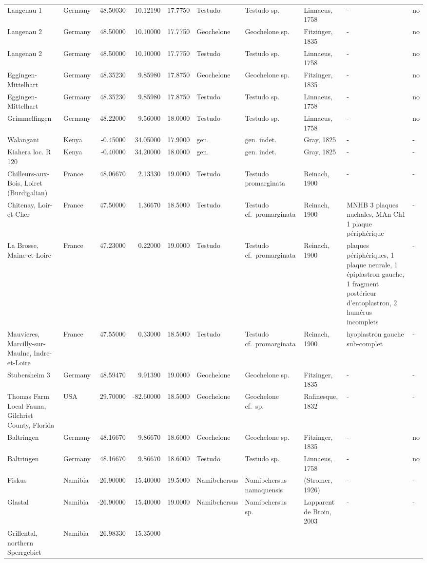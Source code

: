\begin{landscape}
{\begin{longtable}[]{@{}llrrrlllll@{}}
Langenau 1 & Germany & 48.50030 & 10.12190 & 17.7750 & Testudo & Testudo
sp. & Linnaeus, 1758 & - & no\tabularnewline
Langenau 2 & Germany & 48.50000 & 10.10000 & 17.7750 & Geochelone &
Geochelone sp. & Fitzinger, 1835 & - & no\tabularnewline
Langenau 2 & Germany & 48.50000 & 10.10000 & 17.7750 & Testudo & Testudo
sp. & Linnaeus, 1758 & - & no\tabularnewline
Eggingen-Mittelhart & Germany & 48.35230 & 9.85980 & 17.8750 &
Geochelone & Geochelone sp. & Fitzinger, 1835 & - & no\tabularnewline
Eggingen-Mittelhart & Germany & 48.35230 & 9.85980 & 17.8750 & Testudo &
Testudo sp. & Linnaeus, 1758 & - & no\tabularnewline
Grimmelfingen & Germany & 48.22000 & 9.56000 & 18.0000 & Testudo &
Testudo sp. & Linnaeus, 1758 & - & no\tabularnewline
Walangani & Kenya & -0.45000 & 34.05000 & 17.9000 & gen. & gen. indet. &
Gray, 1825 & - & -\tabularnewline
Kiahera loc. R 120 & Kenya & -0.40000 & 34.20000 & 18.0000 & gen. & gen.
indet. & Gray, 1825 & - & -\tabularnewline
Chilleurs-aux-Bois, Loiret (Burdigalian) & France & 48.06670 & 2.13330 &
19.0000 & Testudo & Testudo promarginata & Reinach, 1900 & - &
-\tabularnewline
Chitenay, Loir-et-Cher & France & 47.50000 & 1.36670 & 18.5000 & Testudo
& Testudo cf.~promarginata & Reinach, 1900 & MNHB 3 plaques nuchales,
MAn Ch1 1 plaque périphérique & -\tabularnewline
La Brosse, Maine-et-Loire & France & 47.23000 & 0.22000 & 19.0000 &
Testudo & Testudo cf.~promarginata & Reinach, 1900 & plaques
périphériques, 1 plaque neurale, 1 épiplastron gauche, 1 fragment
postérieur d'entoplastron, 2 humérus incomplets & -\tabularnewline
Mauvieres, Marcilly-sur-Maulne, Indre-et-Loire & France & 47.55000 &
0.33000 & 18.5000 & Testudo & Testudo cf.~promarginata & Reinach, 1900 &
hyoplastron gauche sub-complet & -\tabularnewline
Stubersheim 3 & Germany & 48.59470 & 9.91390 & 19.0000 & Geochelone &
Geochelone sp. & Fitzinger, 1835 & - & -\tabularnewline
Thomas Farm Local Fauna, Gilchrist County, Florida & USA & 29.70000 &
-82.60000 & 18.5000 & Geochelone & Geochelone cf.~sp. & Rafinesque, 1832
& - & -\tabularnewline
Baltringen & Germany & 48.16670 & 9.86670 & 18.6000 & Geochelone &
Geochelone sp. & Fitzinger, 1835 & - & no\tabularnewline
Baltringen & Germany & 48.16670 & 9.86670 & 18.6000 & Testudo & Testudo
sp. & Linnaeus, 1758 & - & no\tabularnewline
Fiskus & Namibia & -26.90000 & 15.40000 & 19.5000 & Namibchersus &
Namibchersus namaquensis & (Stromer, 1926) & - & -\tabularnewline
Glastal & Namibia & -26.90000 & 15.40000 & 19.0000 & Namibchersus &
Namibchersus sp. & Lapparent de Broin, 2003 & - & -\tabularnewline
Grillental, northern Sperrgebiet & Namibia & -26.98330 & 15.35000 &

\end{longtable}}
\end{landscape}
